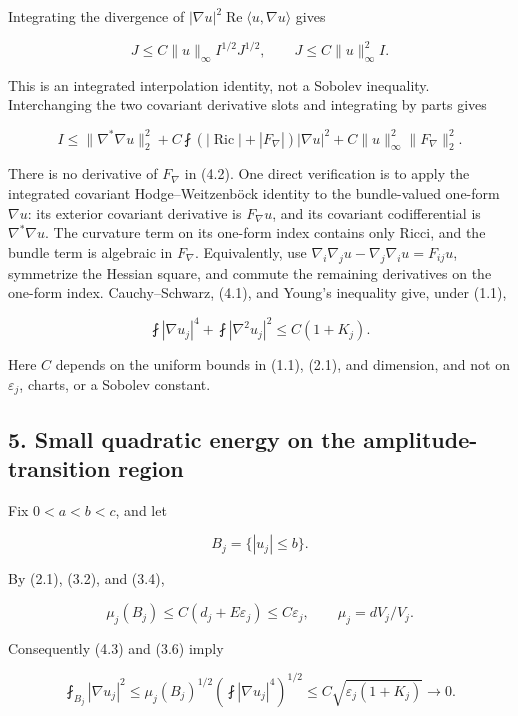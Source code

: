 \documentclass[11pt]{article}
\begin{document}
Integrating the divergence of
\(|\nabla u|^2\operatorname{Re}\langle u,\nabla u\rangle\) gives

\[
J\le C\|u\|_\infty I^{1/2}J^{1/2},
\qquad J\le C\|u\|_\infty^2 I.
\tag{D.4.1}
\]

This is an integrated interpolation identity, not a Sobolev inequality.
Interchanging the two covariant derivative slots and integrating by
parts gives

\[
I\le \|\nabla^*\nabla u\|_2^2
+C\fint (|\operatorname{Ric}|+|F_{\nabla}|)|\nabla u|^2
+C\|u\|_\infty^2\|F_{\nabla}\|_2^2.
\tag{D.4.2}
\]

There is no derivative of \(F_{\nabla}\) in (4.2). One direct
verification is to apply the integrated covariant Hodge--Weitzenböck
identity to the bundle-valued one-form \(\nabla u\): its exterior
covariant derivative is \(F_{\nabla}u\), and its covariant
codifferential is \(\nabla^*\nabla u\). The curvature term on its
one-form index contains only Ricci, and the bundle term is algebraic in
\(F_{\nabla}\). Equivalently, use
\(\nabla_i\nabla_j u-\nabla_j\nabla_i u=F_{ij}u\), symmetrize the
Hessian square, and commute the remaining derivatives on the one-form
index. Cauchy--Schwarz, (4.1), and Young's inequality give, under (1.1),

\[
\boxed{\fint|\nabla u_j|^4+\fint|\nabla^2u_j|^2
\le C(1+K_j).}
\tag{D.4.3}
\]

Here \(C\) depends on the uniform bounds in (1.1), (2.1), and dimension,
and not on \(\varepsilon_j\), charts, or a Sobolev constant.

\hypertarget{small-quadratic-energy-on-the-amplitude-transition-region}{%
\subsection{5. Small quadratic energy on the amplitude-transition
region}\label{small-quadratic-energy-on-the-amplitude-transition-region}}

Fix \(0<a<b<c\), and let

\[
B_j=\{|u_j|\le b\}.
\]

By (2.1), (3.2), and (3.4),

\[
\mu_j(B_j)\le C(d_j+E\varepsilon_j)\le C\varepsilon_j,
\qquad \mu_j=dV_j/V_j.
\tag{D.5.1}
\]

Consequently (4.3) and (3.6) imply

\[
\fint_{B_j}|\nabla u_j|^2
\le \mu_j(B_j)^{1/2}
 \left(\fint|\nabla u_j|^4\right)^{1/2}
\le C\sqrt{\varepsilon_j(1+K_j)}\longrightarrow0.
\tag{D.5.2}
\]
\end{document}
